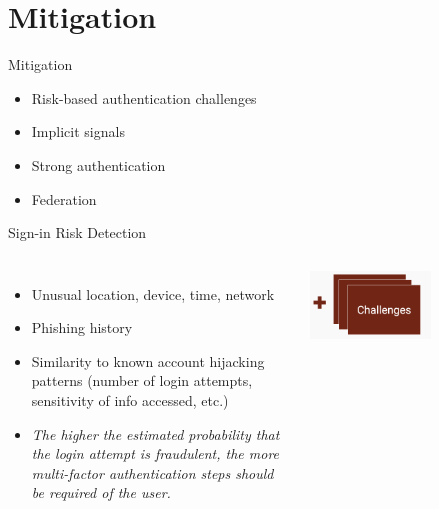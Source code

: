 \documentclass[nobackground,dvipsnames,table]{beamer}
\begin{document}
\section{Mitigation}

\begin{frame}{Mitigation}
    \Large
    \begin{itemize}
        \item Risk-based authentication challenges
        \item Implicit signals
        \item Strong authentication
        \item Federation
    \end{itemize}
\end{frame}

\begin{frame}{Sign-in Risk Detection}
    \begin{columns}
            \small
            \begin{itemize}
                \item Unusual location, device, time, network 
                \item Phishing history
                \item Similarity to known account hijacking patterns (number of login attempts, sensitivity of info accessed, etc.)
                \item \textit{The higher the estimated probability that the login attempt is fraudulent, the more multi-factor authentication steps should be required of the user.}
            \end{itemize}
            \centering
            \includegraphics[width=0.6\textwidth]{challenges}

\end{columns}
\end{frame}
\end{document}
